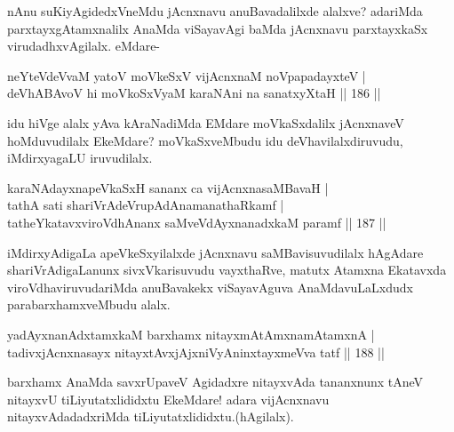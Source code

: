 \begin{artha}
nAnu suKiyAgidedxVneMdu jAcnxnavu anuBavadalilxde alalxve? adariMda parxtayxgAtamxnalilx AnaMda viSayavAgi baMda jAcnxnavu parxtayxkaSx virudadhxvAgilalx. eMdare-
\end{artha}


\begin{shl}
neYteVdeVvaM yatoV moVkeSxV vijAcnxnaM noVpapadayxteV |\\
deVhABAvoV hi moVkoSxV\s yaM karaNAni na sanatxyXtaH \hfill || 186 ||
\end{shl}

\begin{artha}
idu hiVge alalx yAva kAraNadiMda EMdare moVkaSxdalilx jAcnxnaveV hoMduvudilalx EkeMdare? moVkaSxveMbudu idu deVhavilalxdiruvudu, iMdirxyagaLU iruvudilalx. 
\end{artha}

\begin{shl}
karaNAdayxnapeVkaSxH sananx ca vijAcnxnasaMBavaH |\\
tathA sati shariVrAdeVrupAdAnamanathaRkamf |\\
tatheYkatavxviroVdhAnanx saMveVdAyxnanadxkaM paramf \hfill || 187 ||
\end{shl}

\begin{artha}
iMdirxyAdigaLa apeVkeSxyilalxde jAcnxnavu saMBavisuvudilalx hAgAdare shariVrAdigaLanunx sivxVkarisuvudu vayxthaRve, matutx Atamxna Ekatavxda viroVdhaviruvudariMda anuBavakekx viSayavAguva AnaMdavuLaLxdudx parabarxhamxveMbudu alalx.
\end{artha}%


\begin{shl}
yadAyxnanAdxtamxkaM barxhamx nitayxmAtAmxnamAtamxnA |\\
tadivxjAcnxnasayx nitayxtAvxjAjxniVyAninxtayxmeVva tatf \hfill || 188 ||
\end{shl}

\begin{artha}
barxhamx AnaMda savxrUpaveV Agidadxre nitayxvAda tananxnunx tAneV nitayxvU tiLiyutatxlididxtu EkeMdare! adara vijAcnxnavu nitayxvAdadadxriMda tiLiyutatxlididxtu.(hAgilalx).
\end{artha}


